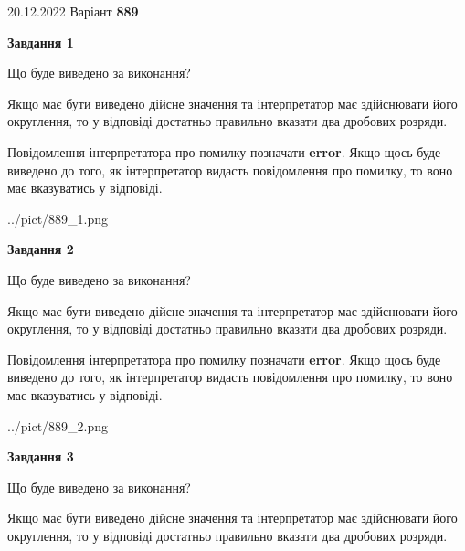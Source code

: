 \documentclass[12pt, ukrainian]{article}
\begin{document}
{20.12.2022 Варіант \No \textbf { 889 }\par}
{
\begin {Large}

{\begin {center}\textbf{Завдання 1}\end {center}}\par
Що буде виведено за виконання? \par

Якщо має бути виведено дійсне значення та інтерпретатор має здійснювати його округлення, 
то у відповіді достатньо правильно вказати два дробових розряди.

Повідомлення інтерпретатора про помилку позначати \textbf{error}.
Якщо щось буде виведено до того, як інтерпретатор видасть повідомлення про помилку, 
то воно має вказуватись у відповіді. \par

\begin{center}
	{../pict/889_1.png}
\end{center}
\newpage

{\begin {center}\textbf{Завдання 2}\end {center}}\par
Що буде виведено за виконання? \par

Якщо має бути виведено дійсне значення та інтерпретатор має здійснювати його округлення, 
то у відповіді достатньо правильно вказати два дробових розряди.

Повідомлення інтерпретатора про помилку позначати \textbf{error}.
Якщо щось буде виведено до того, як інтерпретатор видасть повідомлення про помилку, 
то воно має вказуватись у відповіді. \par

\begin{center}
	{../pict/889_2.png}
\end{center}
\newpage

{\begin {center}\textbf{Завдання 3}\end {center}}\par
Що буде виведено за виконання? \par

Якщо має бути виведено дійсне значення та інтерпретатор має здійснювати його округлення, 
то у відповіді достатньо правильно вказати два дробових розряди.


\end{Large}}
\end{document}
